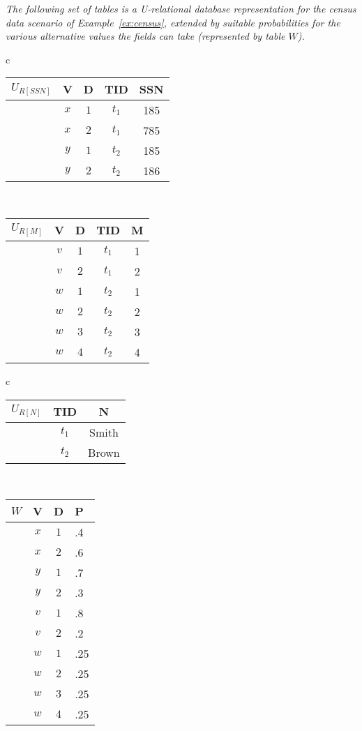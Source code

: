 \begin{example}\em
\label{ex:urelation}
The following set of tables is a U-relational database representation for the census data scenario
of Example~\ref{ex:census}, extended by suitable probabilities for the various alternative values the fields can take (represented by table $W$).
%
\begin{center}
\begin{tabular}{c}
\begin{tabular}{l|cc|c|c}
\hline
$U_{R[SSN]}$ & V & D & TID & SSN \\
\hline
& $x$ & $1$ & $t_1$ & 185 \\
& $x$ & $2$ & $t_1$ & 785 \\
& $y$ & $1$ & $t_2$ & 185 \\
& $y$ & $2$ & $t_2$ & 186 \\
\end{tabular}
\\[15mm]
\begin{tabular}{l|cc|c|c}
\hline
$U_{R[M]}$ & V & D & TID & M \\
\hline
& $v$ & $1$ & $t_1$ & 1 \\
& $v$ & $2$ & $t_1$ & 2 \\
& $w$ & $1$ & $t_2$ & 1 \\
& $w$ & $2$ & $t_2$ & 2 \\
& $w$ & $3$ & $t_2$ & 3 \\
& $w$ & $4$ & $t_2$ & 4 \\
\end{tabular}
\end{tabular}
%
\hspace{5mm}
%
\begin{tabular}{c}
\begin{tabular}{l|c|c}
\hline
$U_{R[N]}$ & TID & N \\
\hline
      & $t_1$ & Smith \\
      & $t_2$ & Brown \\
\end{tabular}
\\[10mm]
\begin{tabular}{l|cc|l}
\hline
$W$ & V & D & P \\
\hline
& $x$ & $1$ & .4 \\
& $x$ & $2$ & .6 \\[.8ex]
& $y$ & $1$ & .7 \\
& $y$ & $2$ & .3 \\[.8ex]
& $v$ & $1$ & .8 \\
& $v$ & $2$ & .2 \\[.8ex]
& $w$ & $1$ & .25 \\
& $w$ & $2$ & .25 \\
& $w$ & $3$ & .25 \\
& $w$ & $4$ & .25 \\
\end{tabular}
\end{tabular}
\end{center}
\end{example}


